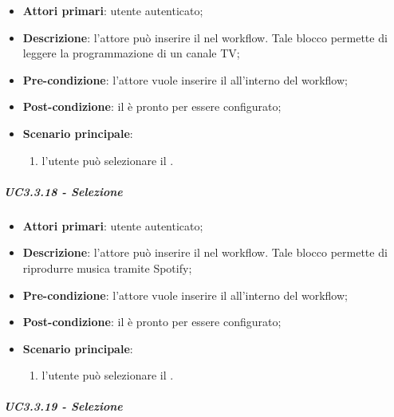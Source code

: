 \begin{itemize}
\item \textbf{Attori primari}: utente autenticato;

\item \textbf{Descrizione}: l'attore può inserire il \BTV{} nel workflow. Tale blocco permette di leggere la programmazione di un canale TV;

\item \textbf{Pre-condizione}: l'attore vuole inserire il \BTV{} all'interno del workflow;

\item \textbf{Post-condizione}: il \BTV{} è pronto per essere configurato;

\item \textbf{Scenario principale}:
\begin{enumerate}
\item  l'utente può selezionare il \BTV{}.

\end{enumerate}
\end{itemize}

\subparagraph{UC3.3.18 - Selezione \BSpotify{}}

\begin{itemize}
\item \textbf{Attori primari}: utente autenticato;

\item \textbf{Descrizione}: l'attore può inserire il \BSpotify{} nel workflow. Tale blocco permette di riprodurre musica tramite Spotify;

\item \textbf{Pre-condizione}: l'attore vuole inserire il \BSpotify{} all'interno del workflow;

\item \textbf{Post-condizione}: il \BSpotify{} è pronto per essere configurato;

\item \textbf{Scenario principale}:
\begin{enumerate}
\item  l'utente può selezionare il \BSpotify{}.

\end{enumerate}
\end{itemize}

\subparagraph{UC3.3.19 - Selezione \BCinema{}}

